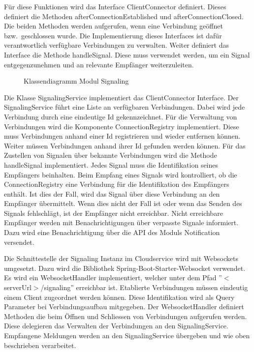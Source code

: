 Für diese Funktionen wird das Interface ClientConnector definiert.
Dieses definiert die Methoden afterConnectionEstablished und afterConnectionClosed.
Die beiden Methoden werden aufgerufen, wenn eine Verbindung geöffnet bzw.\ geschlossen wurde.
Die Implementierung dieses Interfaces ist dafür verantwortlich verfügbare Verbindungen zu verwalten.
Weiter definiert das Interface die Methode handleSignal.
Diese muss verwendet werden, um ein Signal entgegenzunehmen und an relevante Empfänger weiterzuleiten.

\begin{figure}[h]
    \centering
    \begin{minipage}[b]{1\textwidth}
        \caption{Klassendiagramm Modul Signaling}
    \end{minipage}
\end{figure}

Die Klasse SignalingService implementiert das ClientConnector Interface.
Der SignalingService führt eine Liste an verfügbaren Verbindungen.
Dabei wird jede Verbindung durch eine eindeutige Id gekennzeichnet.
Für die Verwaltung von Verbindungen wird die Komponente ConnectionRegistry implementiert.
Diese muss Verbindungen anhand einer Id registrieren und wieder entfernen können.
Weiter müssen Verbindungen anhand ihrer Id gefunden werden können.
Für das Zustellen von Signalen über bekannte Verbindungen wird die Methode handleSignal implementiert.
Jedes Signal muss die Identifikation seines Empfängers beinhalten.
Beim Empfang eines Signals wird kontrolliert, ob die ConnectionRegistry eine Verbindung für die Identifikation des Empfängers enthält.
Ist dies der Fall, wird das Signal über diese Verbindung an den Empfänger übermittelt.
Wenn dies nicht der Fall ist oder wenn das Senden des Signals fehlschlägt, ist der Empfänger nicht erreichbar.
Nicht erreichbare Empfänger werden mit Benachrichtigungen über verpasste Signale informiert.
Dazu wird eine Benachrichtigung über die API des Moduls Notification versendet.

Die Schnittestelle der Signaling Instanz im Cloudservice wird mit Websockets umgesetzt.
Dazu wird die Bibliothek Spring-Boot-Starter-Websocket verwendet.
Es wird ein WebsocketHandler implementiert, welcher unter dem Pfad ''$<$serverUrl$>$/signaling'' erreichbar ist.
Etablierte Verbindungen müssen eindeutig einem Client zugeordnet werden können.
Diese Identifikation wird als Query Parameter bei Verbindungsaufbau mitgegeben.
Der WebsocketHandler definiert Methoden die beim Öffnen und Schliessen von Verbindungen aufgerufen werden.
Diese delegieren das Verwalten der Verbindungen an den SignalingService.
Empfangene Meldungen werden an den SignalingService übergeben und wie oben beschrieben verarbeitet.

